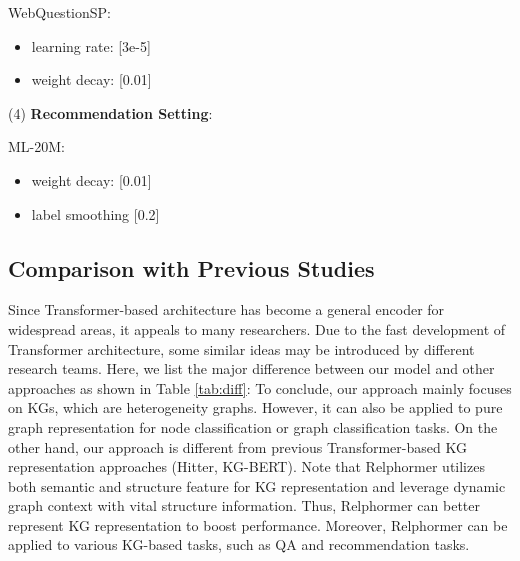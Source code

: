 \documentclass[sigconf]{acmart}
\begin{document}
WebQuestionSP:
\begin{itemize}
\item learning rate: [3e-5]
\item weight decay: [0.01]
\end{itemize}

(4) \textbf{Recommendation Setting}:

ML-20M:
\begin{itemize}
\item weight decay: [0.01]
\item label smoothing [0.2]
\end{itemize}






\subsection{Comparison with Previous Studies}
\label{comparison}
\begin{table}[!t]
\caption{The difference between Relphormer and previous Transformer-based approaches for KGs.}



    \label{tab:diff}
\end{table} 

Since Transformer-based architecture has become a general encoder for widespread areas, it appeals to many researchers.
Due to the fast development of Transformer architecture, some similar ideas may be introduced by different research teams.
Here, we list the major difference between our model and other approaches as shown in Table \ref{tab:diff}:
To conclude, our approach mainly focuses on KGs, which are heterogeneity graphs. 
However, it can also be applied to pure graph representation for node classification or graph classification tasks.
On the other hand, our approach is different from previous Transformer-based KG representation approaches (Hitter, KG-BERT).
Note that Relphormer utilizes both semantic and structure feature for KG representation and leverage dynamic graph context with vital structure information. 
Thus, Relphormer can better represent KG representation to boost performance.
Moreover, Relphormer can be applied to various KG-based tasks, such as QA and recommendation tasks.
\fi
\end{document}
